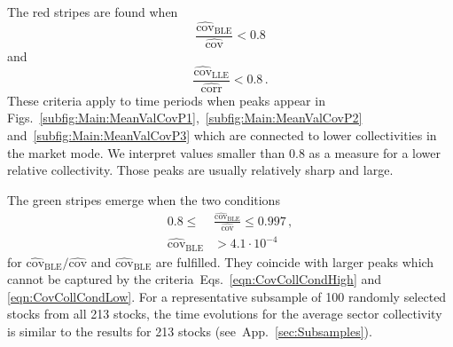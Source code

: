 \documentclass[aps, pra, groupedaddress, showkeys, twocolumn, floatfix, 10pt]{revtex4-2}
\newcommand*\meanNONDiag[1]{\widehat{#1}}
\begin{document}
The red stripes are found when 
\begin{equation} \label{eqn:CovCollCondLow}
	\frac{\meanNONDiag{\text{cov}}_{\text{BLE}}}{\meanNONDiag{\text{cov}}} < 0.8
\end{equation}
%
and
\begin{equation} \label{eqn:CorrCollCondLow}
	\frac{\meanNONDiag{\text{cov}}_{\text{LLE}}}{\meanNONDiag{\text{corr}}} < 0.8 \,.
\end{equation}
These criteria apply to time periods when peaks appear in Figs.~\ref{subfig:Main:MeanValCovP1},~\ref{subfig:Main:MeanValCovP2} and~\ref{subfig:Main:MeanValCovP3} which are connected to lower collectivities in the market mode.
We interpret values smaller than $0.8$ as a measure for a lower relative collectivity.
Those peaks are usually relatively sharp and large.

The green stripes emerge when the two conditions
\begin{align} \label{eqn:CovCollCondHigh_2}
  0.8 \leq	& \frac{\meanNONDiag{\text{cov}}_{\text{BLE}}}{\meanNONDiag{\text{cov}}} \leq 0.997 \,, \\
  \meanNONDiag{\text{cov}}_{\text{BLE}} &> 4.1 \cdot 10^{-4}
\end{align}
for $\meanNONDiag{\text{cov}}_{\text{BLE}} / \meanNONDiag{\text{cov}} $ and $\meanNONDiag{\text{cov}}_{\text{BLE}}$ are fulfilled.
They coincide with larger peaks
which cannot be captured by the criteria~Eqs.~\eqref{eqn:CovCollCondHigh} and \eqref{eqn:CovCollCondLow}.
For a representative subsample of 100 randomly selected stocks from all 213 stocks, the time evolutions for the average sector collectivity is similar to the results for 213 stocks (see~App.~\ref{sec:Subsamples}).
\end{document}
